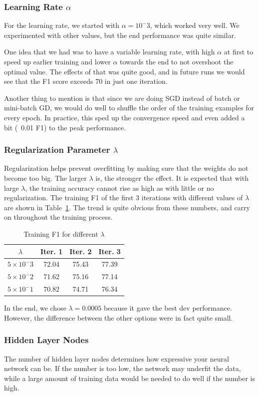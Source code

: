 \documentclass[12pt, twocolumn]{article}
\begin{document}
\subsubsection{Learning Rate $\alpha$}
For the learning rate, we started with $\alpha = 10^-3$, which worked very well. We experimented with other values, but the end performance was quite similar.

One idea that we had was to have a variable learning rate, with high $\alpha$ at first to speed up earlier training and lower $\alpha$ towards the end to not overshoot the optimal value. The effects of that was quite good, and in future runs we would see that the F1 score exceeds 70 in just one iteration.

Another thing to mention is that since we are doing SGD instead of batch or mini-batch GD, we would do well to shuffle the order of the training examples for every epoch. In practice, this sped up the convergence speed and even added a bit (~0.01 F1) to the peak performance.
\subsubsection{Regularization Parameter $\lambda$}
Regularization helps prevent overfitting by making sure that the weights do not become too big. The larger $\lambda$ is, the stronger the effect. It is expected that with large $\lambda$, the training accuracy cannot rise as high as with little or no regularization. The training F1 of the first 3 iterations with different values of $\lambda$ are shown in Table~\ref{tab:lambda}. The trend is quite obvious from these numbers, and carry on throughout the training process.
\begin{table}[H]
\centering
	\begin{tabular}{|c|c|c|c|}
		\hline
		$\lambda$ & Iter. 1 & Iter. 2 & Iter. 3 \\\hline
		$5\times10^-3$ & 72.04 & 75.43 & 77.39 \\\hline
		$5\times10^-2$ & 71.62 & 75.16 & 77.14 \\\hline
		$5\times10^-1$ & 70.82 & 74.71 & 76.34 \\\hline
	\end{tabular}
	\caption{Training F1 for different $\lambda$}
\label{tab:lambda}
\end{table}
In the end, we chose $\lambda = 0.0005$ because it gave the best dev performance. However, the difference between the other options were in fact quite small.
\subsubsection{Hidden Layer Nodes}
The number of hidden layer nodes determines how expressive your neural network can be. If the number is too low, the network may underfit the data, while a large amount of training data would be needed to do well if the number is high.
\end{document}
